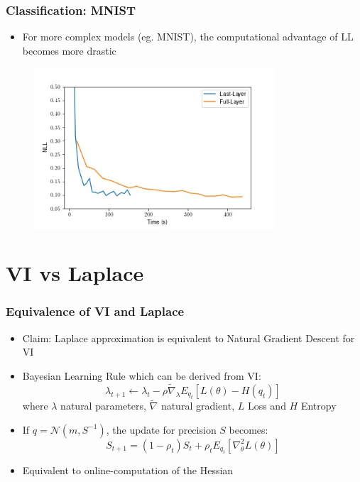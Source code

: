 \documentclass{beamer}
\begin{document}
        \begin{frame}
            \frametitle{Classification: MNIST}
            \begin{itemize}
                \item For more complex models (eg. MNIST), the computational advantage of LL becomes more drastic
            \end{itemize}
            \begin{figure}
                \includegraphics[width=0.8\textwidth]{images/Classification/LLvsFull.jpg}
            \end{figure}
        \end{frame}


        \section{VI vs Laplace}

        \begin{frame}
            \frametitle{Equivalence of VI and Laplace}
            \begin{itemize}
                \item Claim: Laplace approximation is equivalent to Natural Gradient Descent for VI
                \item Bayesian Learning Rule which can be derived from VI:     
                    \begin{equation}
                        \lambda_{t+1} \leftarrow \lambda_{t} - \rho \tilde{\nabla}_\lambda E_{q_t}[L(\theta) - H(q_t)]
                    \end{equation}
                    where $\lambda$ natural parameters, $\tilde{\nabla}$ natural gradient, $L$ Loss and $H$ Entropy
                \item If $q = \mathcal{N}(m, S^{-1})$, the update for precision $S$ becomes:
                    \begin{equation}
                        S_{t+1} = (1 - \rho_t) S_t + \rho_t E_{q_t}[\nabla^2_\theta L(\theta)]
                    \end{equation}
                \item Equivalent to online-computation of the Hessian
            \end{itemize}
        \end{frame}
\end{document}
